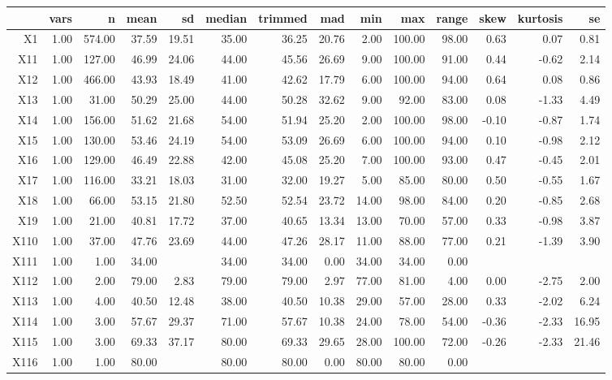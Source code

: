 \documentclass[a4paper,headsepline,footsepline,fontsize=11pt,BCOR=12mm,DIV=12]{report}
\begin{document}
\begin{tabular}{rrrrrrrrrrrrrr}
  \hline
 & vars & n & mean & sd & median & trimmed & mad & min & max & range & skew & kurtosis & se \\ 
  \hline
X1 & 1.00 & 574.00 & 37.59 & 19.51 & 35.00 & 36.25 & 20.76 & 2.00 & 100.00 & 98.00 & 0.63 & 0.07 & 0.81 \\ 
  X11 & 1.00 & 127.00 & 46.99 & 24.06 & 44.00 & 45.56 & 26.69 & 9.00 & 100.00 & 91.00 & 0.44 & -0.62 & 2.14 \\ 
  X12 & 1.00 & 466.00 & 43.93 & 18.49 & 41.00 & 42.62 & 17.79 & 6.00 & 100.00 & 94.00 & 0.64 & 0.08 & 0.86 \\ 
  X13 & 1.00 & 31.00 & 50.29 & 25.00 & 44.00 & 50.28 & 32.62 & 9.00 & 92.00 & 83.00 & 0.08 & -1.33 & 4.49 \\ 
  X14 & 1.00 & 156.00 & 51.62 & 21.68 & 54.00 & 51.94 & 25.20 & 2.00 & 100.00 & 98.00 & -0.10 & -0.87 & 1.74 \\ 
  X15 & 1.00 & 130.00 & 53.46 & 24.19 & 54.00 & 53.09 & 26.69 & 6.00 & 100.00 & 94.00 & 0.10 & -0.98 & 2.12 \\ 
  X16 & 1.00 & 129.00 & 46.49 & 22.88 & 42.00 & 45.08 & 25.20 & 7.00 & 100.00 & 93.00 & 0.47 & -0.45 & 2.01 \\ 
  X17 & 1.00 & 116.00 & 33.21 & 18.03 & 31.00 & 32.00 & 19.27 & 5.00 & 85.00 & 80.00 & 0.50 & -0.55 & 1.67 \\ 
  X18 & 1.00 & 66.00 & 53.15 & 21.80 & 52.50 & 52.54 & 23.72 & 14.00 & 98.00 & 84.00 & 0.20 & -0.85 & 2.68 \\ 
  X19 & 1.00 & 21.00 & 40.81 & 17.72 & 37.00 & 40.65 & 13.34 & 13.00 & 70.00 & 57.00 & 0.33 & -0.98 & 3.87 \\ 
  X110 & 1.00 & 37.00 & 47.76 & 23.69 & 44.00 & 47.26 & 28.17 & 11.00 & 88.00 & 77.00 & 0.21 & -1.39 & 3.90 \\ 
  X111 & 1.00 & 1.00 & 34.00 &  & 34.00 & 34.00 & 0.00 & 34.00 & 34.00 & 0.00 &  &  &  \\ 
  X112 & 1.00 & 2.00 & 79.00 & 2.83 & 79.00 & 79.00 & 2.97 & 77.00 & 81.00 & 4.00 & 0.00 & -2.75 & 2.00 \\ 
  X113 & 1.00 & 4.00 & 40.50 & 12.48 & 38.00 & 40.50 & 10.38 & 29.00 & 57.00 & 28.00 & 0.33 & -2.02 & 6.24 \\ 
  X114 & 1.00 & 3.00 & 57.67 & 29.37 & 71.00 & 57.67 & 10.38 & 24.00 & 78.00 & 54.00 & -0.36 & -2.33 & 16.95 \\ 
  X115 & 1.00 & 3.00 & 69.33 & 37.17 & 80.00 & 69.33 & 29.65 & 28.00 & 100.00 & 72.00 & -0.26 & -2.33 & 21.46 \\ 
  X116 & 1.00 & 1.00 & 80.00 &  & 80.00 & 80.00 & 0.00 & 80.00 & 80.00 & 0.00 &  &  &  \\ 
   \hline
\end{tabular}
\end{document}
